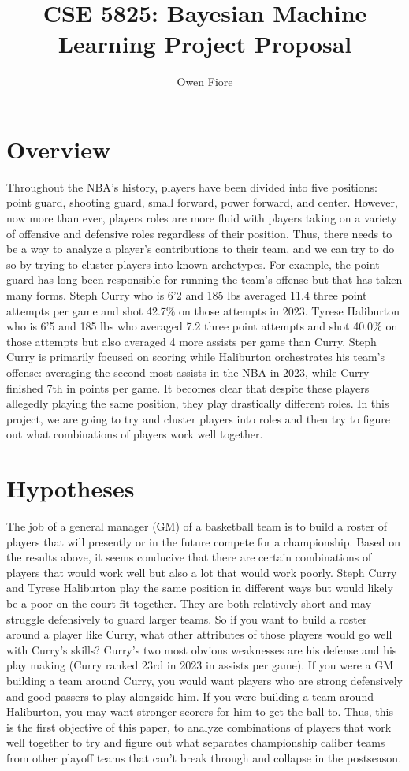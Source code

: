 \documentclass[12pt, letterpaper, titlepage]{article}
\title{CSE 5825: Bayesian Machine Learning Project Proposal}
\author{Owen Fiore}
\begin{document}
\maketitle

\section{Overview}
Throughout the NBA's history, players have been divided into five positions:
point guard, shooting guard, small forward, power forward, and center.  However,
now more than ever, players roles are more fluid with players taking on a variety
of offensive and defensive roles regardless of their position.  Thus, there needs
to be a way to analyze a player's contributions to their team, and we can try to
do so by trying to cluster players into known archetypes.  For example, the
point guard has long been responsible for running the team's offense but that
has taken many forms. Steph Curry who is 6'2 and 185 lbs averaged 11.4 three 
point attempts per game and shot 42.7\% on those attempts in 2023.
Tyrese Haliburton who is 6'5 and 185 lbs who averaged 7.2
three point attempts and shot 40.0\% on those attempts but also averaged 4 more
assists per game than Curry.  Steph Curry is primarily focused on scoring while
Haliburton orchestrates his team's offense: averaging the second most assists
in the NBA in 2023, while Curry finished 7th in points per game.  It becomes
clear that despite these players allegedly playing the same position, they play
drastically different roles.  In this project, we are going to try and cluster
players into roles and then try to figure out what combinations of players work
well together.

\section{Hypotheses}
The job of a general manager (GM) of a basketball team is to build a roster of
players that will presently or in the future compete for a championship. Based
on the results above, it seems conducive that there are certain combinations of
players that would work well but also a lot that would work poorly.  Steph Curry
and Tyrese Haliburton play the same position in different ways but would likely
be a poor on the court fit together.  They are both relatively short and may
struggle defensively to guard larger teams.  So if you want to build a roster
around a player like Curry, what other attributes of those players would go well
with Curry's skills?  Curry's two most obvious weaknesses are his defense and his
play making (Curry ranked 23rd in 2023 in assists per game). If you were a GM 
building a team around Curry, you would want players who are strong defensively
and good passers to play alongside him.  If you were building a team around
Haliburton, you may want stronger scorers for him to get the ball to.  Thus, this
is the first objective of this paper, to analyze combinations of players that
work well together to try and figure out what separates championship caliber teams
from other playoff teams that can't break through and collapse in the postseason.
\end{document}
